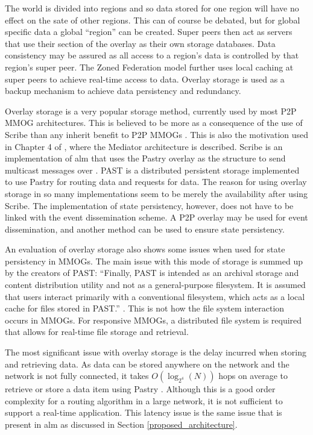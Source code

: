 \documentclass[journal,oneside,a4paper,onecolumn]{IEEEtran}
\begin{document}
The world is divided into regions and so data stored for one region will have no effect on the sate of other regions. This can of course be debated, but for global specific data a global ``region'' can be created. Super peers then act as servers that use their section of the overlay as their own storage databases. Data consistency may be assured as all access to a region's data is controlled by that region's super peer. The Zoned Federation model further uses local caching at super peers to achieve real-time access to data. Overlay storage is used as a backup mechanism to achieve data persistency and redundancy.

Overlay storage is a very popular storage method, currently used by most P2P MMOG architectures. This is believed to be more as a consequence of the use of Scribe than any inherit benefit to P2P MMOGs \cite{past_storage_focus}. This is also the motivation used in Chapter 4 of \cite{Fan_phd}, where the Mediator architecture is described. Scribe is an implementation of \ac{alm} that uses the Pastry overlay as the structure to send multicast messages over \cite{scribe}. PAST is a distributed persistent storage implemented to use Pastry for routing data and requests for data. The reason for using overlay storage in so many implementations seem to be merely the availability after using Scribe. The implementation of state persistency, however, does not have to be linked with the event dissemination scheme. A P2P overlay may be used for event dissemination, and another method can be used to ensure state persistency.

An evaluation of overlay storage also shows some issues when used for state persistency in MMOGs. The main issue with this mode of storage is summed up by the creators of PAST: ``Finally, PAST is intended as an archival storage and content distribution utility and not as a general-purpose filesystem. It is assumed that users interact primarily with a conventional filesystem, which acts as a local cache for files stored in PAST.'' \cite{storage_and_chaching_PAST}. This is not how the file system interaction occurs in MMOGs. For responsive MMOGs, a distributed file system is required that allows for real-time file storage and retrieval.

The most significant issue with overlay storage is the delay incurred when storing and retrieving data. As data can be stored anywhere on the network and the network is not fully connected, it takes $O(\log_{2^4}(N))$ hops on average to retrieve or store a data item using Pastry \cite{storage_and_chaching_PAST}. Although this is a good order complexity for a routing algorithm in a large network, it is not sufficient to support a real-time application. This latency issue is the same issue that is present in \ac{alm} as discussed in Section \ref{proposed_architecture}.
\end{document}
